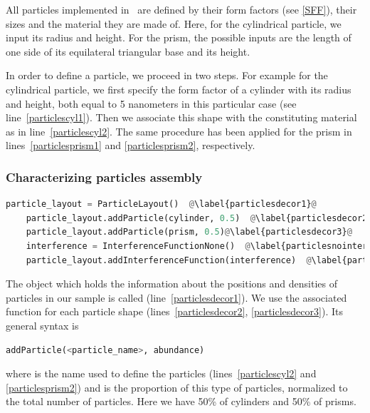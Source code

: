 All particles implemented in \BornAgain\ are defined by their
form factors (see \cref{SFF}), their sizes and the material
they are made of. Here, for the
cylindrical particle, we input its radius and height.  For the prism,
the possible inputs are the length of one side of its equilateral triangular
base and its height.

In order to define a particle, we proceed in two steps. For example for
the cylindrical particle, we first specify the form factor of a cylinder with
its radius and height, both equal to 5 nanometers in this particular
case (see line~\ref{particlescyl1}). Then we associate this shape with
the constituting material as in line~\ref{particlescyl2}.
The same procedure has been applied for the prism in lines~\ref{particlesprism1} and \ref{particlesprism2}, respectively.

\subsubsection{Characterizing particles assembly}
\begin{lstlisting}[language=python, style=eclipseboxed, name=ex1,nolol]
    particle_layout = ParticleLayout()  @\label{particlesdecor1}@
    particle_layout.addParticle(cylinder, 0.5)  @\label{particlesdecor2}@
    particle_layout.addParticle(prism, 0.5)@\label{particlesdecor3}@
    interference = InterferenceFunctionNone()  @\label{particlesnointerf}@
    particle_layout.addInterferenceFunction(interference)  @\label{particlesinterf}@
\end{lstlisting}
The object which holds the information about the positions and densities of particles
in our sample is called 
(line~\ref{particlesdecor1}). We use the associated function 
for each particle shape (lines~\ref{particlesdecor2}, \ref{particlesdecor3}). Its general syntax is

\begin{lstlisting}[language=python, style=eclipse,numbers=none]
addParticle(<particle_name>, abundance)
\end{lstlisting}
where  is the name used to define the particles
(lines~\ref{particlescyl2} and \ref{particlesprism2}) and
 is the proportion of this type of particles,
normalized to the total number of particles. Here we have 50\% of cylinders
and 50\% of prisms.

